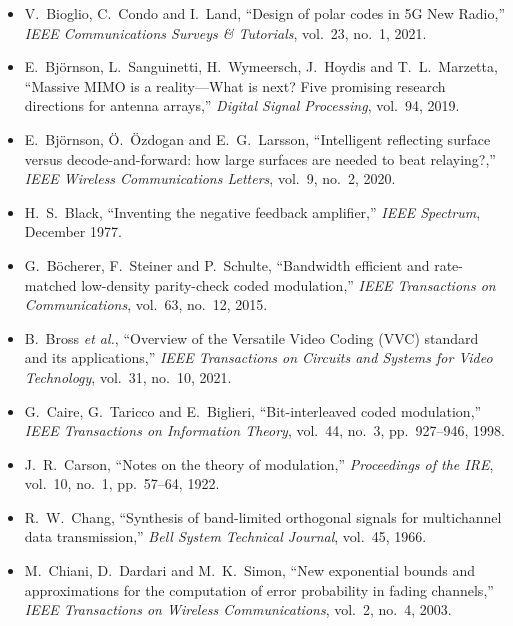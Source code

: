 \begin{itemize}[leftmargin=1.5em,itemindent=-1.5em,itemsep=1.5pt plus 1pt,parsep=0pt,topsep=4pt,label={}]
\item V.~Bioglio, C.~Condo and I.~Land, ``Design of polar codes in 5G New Radio,'' \emph{IEEE Communications Surveys \& Tutorials}, vol.~23, no.~1, 2021.
\item E.~Bj\"ornson, L.~Sanguinetti, H.~Wymeersch, J.~Hoydis and T.~L.~Marzetta, ``Massive MIMO is a reality---What is next? Five promising research directions for antenna arrays,'' \emph{Digital Signal Processing}, vol.~94, 2019.
\item E.~Bj\"ornson, \"O.~\"Ozdogan and E.~G.~Larsson, ``Intelligent reflecting surface versus decode-and-forward: how large surfaces are needed to beat relaying?,'' \emph{IEEE Wireless Communications Letters}, vol.~9, no.~2, 2020.
\item H.~S.~Black, ``Inventing the negative feedback amplifier,'' \emph{IEEE Spectrum}, December 1977.
\item G.~B\"ocherer, F.~Steiner and P.~Schulte, ``Bandwidth efficient and rate-matched low-density parity-check coded modulation,'' \emph{IEEE Transactions on Communications}, vol.~63, no.~12, 2015.
\item B.~Bross \emph{et al.}, ``Overview of the Versatile Video Coding (VVC) standard and its applications,'' \emph{IEEE Transactions on Circuits and Systems for Video Technology}, vol.~31, no.~10, 2021.
\item G.~Caire, G.~Taricco and E.~Biglieri, ``Bit-interleaved coded modulation,'' \emph{IEEE Transactions on Information Theory}, vol.~44, no.~3, pp.~927--946, 1998.
\item J.~R.~Carson, ``Notes on the theory of modulation,'' \emph{Proceedings of the IRE}, vol.~10, no.~1, pp.~57--64, 1922.
\item R.~W.~Chang, ``Synthesis of band-limited orthogonal signals for multichannel data transmission,'' \emph{Bell System Technical Journal}, vol.~45, 1966.
\item M.~Chiani, D.~Dardari and M.~K.~Simon, ``New exponential bounds and approximations for the computation of error probability in fading channels,'' \emph{IEEE Transactions on Wireless Communications}, vol.~2, no.~4, 2003.

\end{itemize}
